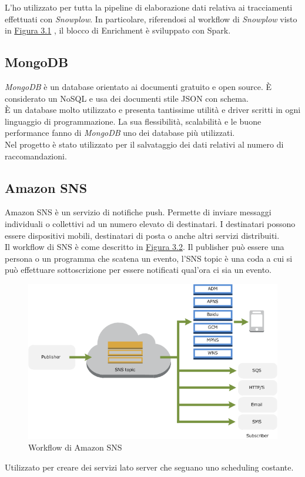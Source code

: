 \documentclass[a4paper, 12pt, twoside, openright]{book}
\begin{document}
L'ho utilizzato per tutta la pipeline di elaborazione dati relativa ai tracciamenti effettuati con \textit{Snowplow}. In particolare, riferendosi al workflow di \textit{Snowplow} visto in \hyperref[snowplow-workflow]{Figura 3.1}
, il blocco di Enrichment è sviluppato con Spark.\\

\subsection{MongoDB}
\textit{MongoDB} è un database orientato ai documenti gratuito e open source. \`{E} considerato un NoSQL e usa dei documenti stile JSON con schema.\\
\`{E} un database molto utilizzato e presenta tantissime utilità e driver scritti in ogni linguaggio di programmazione. La sua flessibilità, scalabilità e le buone performance fanno di \textit{MongoDB} uno dei database più utilizzati.\\
Nel progetto è stato utilizzato per il salvataggio dei dati relativi al numero di raccomandazioni.\\

\subsection{Amazon SNS}
Amazon SNS è un servizio di notifiche push. Permette di inviare messaggi individuali o collettivi ad un numero elevato di destinatari. I destinatari possono essere dispositivi mobili, destinatari di posta o anche altri servizi distribuiti.\\
Il workflow di SNS è come descritto in \hyperref[sns-workflow]{Figura 3.2}. Il publisher può essere una persona o un programma che scatena un evento, l'SNS topic è una coda a cui si può effettuare sottoscrizione per essere notificati qual'ora ci sia un evento.
\begin{figure}[H]
	\centering
	\label{sns-workflow}
	\includegraphics[width=1.0\textwidth]{images/sns-workflow.png}
	\caption{Workflow di Amazon SNS}
\end{figure} 
Utilizzato per creare dei servizi lato server che seguano uno scheduling costante.\\
\end{document}
